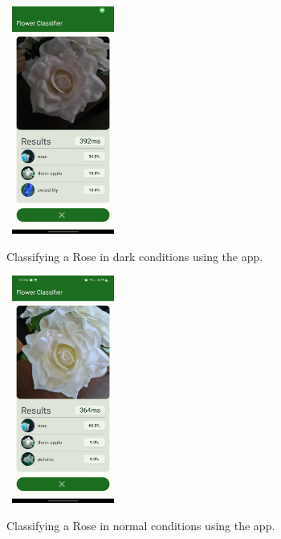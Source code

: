 \documentclass{article}
\begin{document}
\begin{figure}[h]\
    \includegraphics[width=0.3\textwidth]{rose_light_1.jpg}
    \caption{Classifying a Rose in dark conditions using the app.}
    \label{fig:rose_dark}
\end{figure}

\begin{figure}[h]\
    \includegraphics[width=0.3\textwidth]{rose_light_2.jpg}
    \caption{Classifying a Rose in normal conditions using the app.}
    \label{fig:rose_med}
\end{figure}
\end{document}
